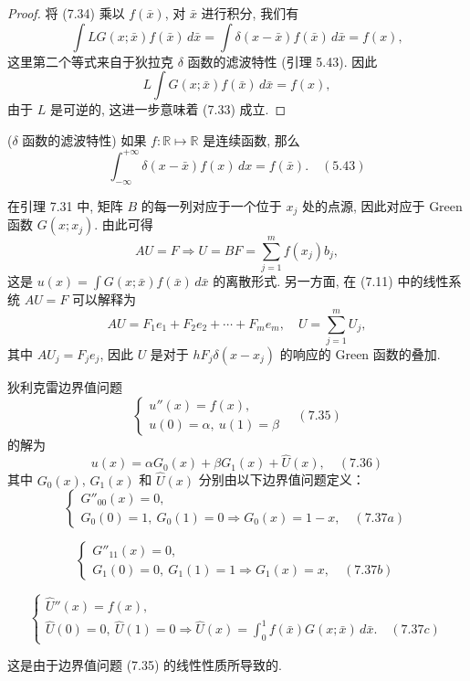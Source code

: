 \documentclass[a4paper]{ctexart}
\newcommand{\hl}[1]
{\noindent {\bf {#1}}}
\begin{document}
\begin{proof}
将 (7.34) 乘以 $f(\bar{x})$, 对 $\bar{x}$ 进行积分, 我们有
$$
\int LG(x; \bar{x})f(\bar{x}) \, d\bar{x} 
= \int \delta(x - \bar{x})f(\bar{x}) \, d\bar{x} = f(x),
$$
这里第二个等式来自于狄拉克 $\delta$ 函数的滤波特性 (引理 5.43). 因此
$$
L \int G(x; \bar{x})f(\bar{x}) \, d\bar{x} = f(x),
$$
由于 $L$ 是可逆的, 这进一步意味着 (7.33) 成立.
\end{proof}

\hl{引理 5.43} ($\delta$ 函数的滤波特性) 如果 $f: \mathbb{R} \mapsto \mathbb{R}$ 
是连续函数, 那么
$$
\int_{-\infty}^{+\infty} \delta(x - \bar{x})f(x) \, dx = f(\bar{x}). \quad (5.43)
$$

在引理 7.31 中, 矩阵 $B$ 的每一列对应于一个位于 $x_j$ 处的点源, 
因此对应于 Green 函数 $G(x; x_j)$. 由此可得
$$
AU = F \Rightarrow U = BF = \sum_{j = 1}^{m} f(x_j) b_j,
$$
这是 $u(x) = \int G(x; \bar{x})f(\bar{x}) \, d\bar{x}$ 的离散形式. 
另一方面, 在 (7.11) 中的线性系统 $AU = F$ 可以解释为
$$
AU = F_1 e_1 + F_2 e_2 + \cdots + F_m e_m, \quad U = \sum_{j = 1}^{m} U_j,
$$
其中 $AU_j = F_je_j$, 因此 $U$ 是对于 $hF_j \delta(x - x_j)$ 的响应的 
Green 函数的叠加. 

\hl{定理 7.34} 狄利克雷边界值问题
$$
\begin{cases}
u''(x) = f(x), \\
u(0) = \alpha, \ u(1) = \beta
\end{cases} \quad (7.35)
$$
的解为
$$
u(x) = \alpha G_0(x) + \beta G_1(x) + \hat{U}(x), \quad (7.36)
$$
其中 $G_0(x)$, $G_1(x)$ 和 $\hat{U}(x)$ 分别由以下边界值问题定义：
$$
\begin{cases}
G''_{00}(x) = 0, \\
G_0(0) = 1, \ G_0(1) = 0 \Rightarrow G_0(x) = 1 - x, \quad (7.37a)
\end{cases}
$$

$$
\begin{cases}
G''_{11}(x) = 0, \\
G_1(0) = 0, \ G_1(1) = 1 \Rightarrow G_1(x) = x, \quad (7.37b)
\end{cases}
$$

$$
\begin{cases}
\hat{U}''(x) = f(x), \\
\hat{U}(0) = 0, \ \hat{U}(1) = 0 \Rightarrow \hat{U}(x) 
= \int_{0}^{1} f(\bar{x})G(x; \bar{x}) \, d\bar{x}. \quad (7.37c)
\end{cases}
$$

这是由于边界值问题 (7.35) 的线性性质所导致的.
\end{document}
